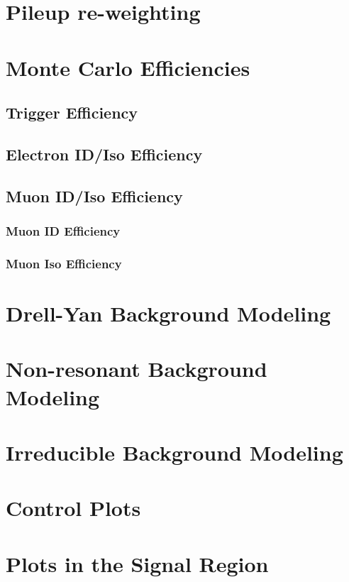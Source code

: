 \section{Pileup re-weighting}
\section{Monte Carlo Efficiencies}
\subsection{Trigger Efficiency}
\subsection{Electron ID/Iso Efficiency}
\subsection{Muon ID/Iso Efficiency}
\subsubsection{Muon ID Efficiency}
\subsubsection{Muon Iso Efficiency}

\section{Drell-Yan Background Modeling}

\section{Non-resonant Background Modeling}

\section{Irreducible Background Modeling}

\section{Control Plots}

\section{Plots in the Signal Region}
